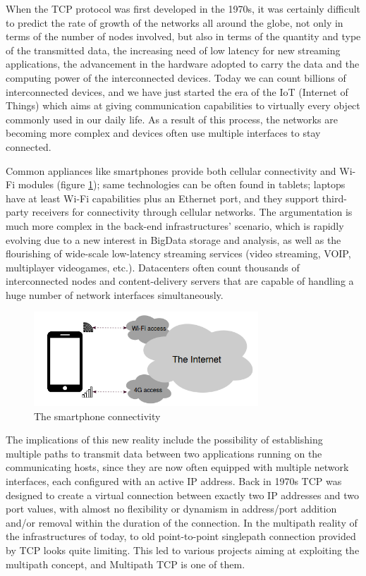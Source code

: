 \vspace{5mm}
When the TCP protocol was first developed in the 1970s, it was certainly difficult to predict the rate of growth of the networks all around the globe, not only in terms of the number of nodes involved, but also in terms of the quantity and type of the transmitted data, the increasing need of low latency for new streaming applications, the advancement in the hardware adopted to carry the data and the computing power of the interconnected devices. Today we can count billions of interconnected devices, and we have just started the era of the IoT (Internet of Things) which aims at giving communication capabilities to virtually every object commonly used in our daily life.
As a result of this process, the networks are becoming more complex and devices often use multiple interfaces to stay connected. 


Common appliances like smartphones provide both cellular connectivity and Wi-Fi modules (figure \ref{fig:smartphones}); same technologies can be often found in tablets; laptops have at least Wi-Fi capabilities plus an Ethernet port, and they support third-party receivers for connectivity through cellular networks. The argumentation is much more complex in the back-end infrastructures' scenario, which is rapidly evolving due to a new interest in BigData storage and analysis, as well as the flourishing of wide-scale low-latency streaming services (video streaming, VOIP, multiplayer videogames, etc.). Datacenters often count thousands of interconnected nodes and content-delivery servers that are capable of handling a huge number of network interfaces simultaneously.

\begin{figure}[!htb]
\centering
\includegraphics[width=0.75\textwidth]{images/smartphones}
\caption{The smartphone connectivity}
\label{fig:smartphones}
\end{figure}

The implications of this new reality include the possibility of establishing multiple paths to transmit data between two applications running on the communicating hosts, since they are now often equipped with multiple network interfaces, each configured with an active IP address. Back in 1970s TCP was designed to create a virtual connection between exactly two IP addresses and two port values, with almost no flexibility or dynamism in address/port addition and/or removal within the duration of the connection. In the multipath reality of the infrastructures of today, to old point-to-point singlepath connection provided by TCP looks quite limiting. This led to various projects aiming at exploiting the multipath concept, and Multipath TCP is one of them.


